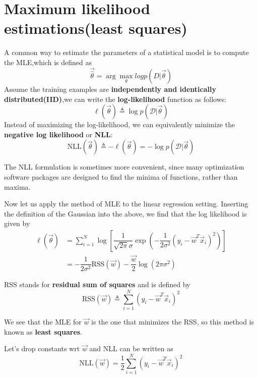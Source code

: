 \documentclass[]{article}
\begin{document}
\section{Maximum likelihood estimations(least squares)}
A common way to estimate the parameters of a statistical model is to compute the MLE,which is defined as
\begin{equation}
\vec{\hat{\theta}}=\arg\max_\theta{logp(D|\vec{\theta})}
\end{equation}
Assume the training examples are \textbf{independently and identically distributed(IID)},we can write the \textbf{log-likelihood} function as follows:
\begin{equation}
\ell(\vec{\theta}) \triangleq \log p(\mathcal{D}|\vec{\theta})
\end{equation}
Instead of maximizing the log-likelihood, we can equivalently minimize the \textbf{negative log likelihood} or \textbf{NLL}:
\begin{equation}
\text{NLL}(\vec{\theta}) \triangleq -\ell(\vec{\theta})=-\log p(\mathcal{D}|\vec{\theta})
\end{equation}

The NLL formulation is sometimes more convenient, since many optimization software packages are designed to find the minima of functions, rather than maxima.

Now let us apply the method of MLE to the linear regression setting. Inserting the definition of the Gaussian into the above, we find that the log likelihood is given by
\begin{align}
\ell(\vec{\theta})& =\sum\limits_{i=1}^N \log\left[\dfrac{1}{\sqrt{2\pi}\sigma}\exp\left(-\dfrac{1}{2\sigma^2}(y_i-\vec{w}^T\vec{x}_i)^2\right)\right] \\
& =-\dfrac{1}{2\sigma^2}\text{RSS}(\vec{w})-\dfrac{\vec{w}}{2}\log(2\pi\sigma^2)
\end{align}

RSS stands for \textbf{residual sum of squares} and is defined by
\begin{equation}
\text{RSS}(\vec{w}) \triangleq \sum\limits_{i=1}^N (y_i-\vec{w}^T\vec{x}_i)^2
\end{equation}

We see that the MLE for $\vec{w}$ is the one that minimizes the RSS, so this method is known as \textbf{least squares}.

Let's drop constants wrt $\vec{w}$ and NLL can be written as
\begin{equation}
\text{NLL}(\vec{w}) = \dfrac{1}{2}\sum\limits_{i=1}^N (y_i-\vec{w}^T\vec{x}_i)^2
\end{equation}
\end{document}
